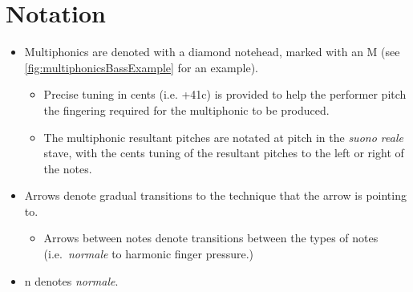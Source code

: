 \section*{Notation}
\begin{itemize}
  \item Multiphonics are denoted with a diamond notehead, marked with an M (see \autoref{fig:multiphonicsBassExample} for an example). 
  \begin{itemize}
    \item Precise tuning in cents (i.e. +41c) is provided to help the performer pitch the fingering required for the multiphonic to be produced.
    \item The multiphonic resultant pitches are notated at pitch in the \emph{suono reale} stave, with the cents tuning of the resultant pitches to the left or right of the notes.
  \end{itemize}
    \item Arrows denote gradual transitions to the technique that the arrow is pointing to.\begin{itemize}
      \item Arrows between notes denote transitions between the types of notes (i.e.\ \emph{normale} to harmonic finger pressure.)
    \end{itemize}
    \item n denotes \emph{normale}.
\end{itemize}

\newpage\label{app:celloPiece Score}
